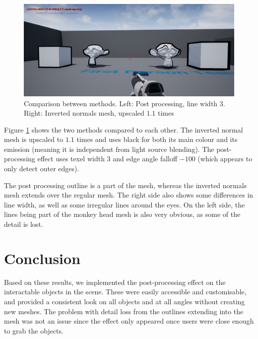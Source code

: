 \begin{figure}[H]
\centering
\includegraphics[width=1.0\textwidth]{Shader/comparison.png}
\caption{Comparison between methods. Left: Post processing, line width $3$. Right: Inverted normals mesh, upscaled $1.1$ times}
\label{fig:comparison}
\end{figure}

Figure \ref{fig:comparison} shows the two methods compared to each other. The inverted normal mesh is upscaled to $ 1.1 $ times and uses black for both its main colour and its emission (meaning it is independent from light source blending). The post-processing effect uses texel width $3$ and edge angle falloff $-100$ (which appears to only detect outer edges).

The post processing outline is a part of the mesh, whereas the inverted normals mesh extends over the regular mesh. The right side also shows some differences in line width, as well as some irregular lines around the eyes. On the left side, the lines being part of the monkey head mesh is also very obvious, as some of the detail is lost. 

\section*{Conclusion}

Based on these results, we implemented the post-processing effect on the interactable objects in the scene. These were easily accessible and customisable, and provided a consistent look on all objects and at all angles without creating new meshes. The problem with detail loss from the outlines extending into the mesh was not an issue since the effect only appeared once users were close enough to grab the objects.
